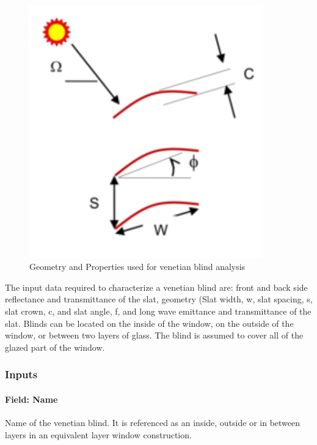 \begin{figure}[hbtp] %
\centering
\includegraphics[width=0.9\textwidth, height=0.9\textheight, keepaspectratio=true]{media/image047.png}
\caption{Geometry and Properties used for venetian blind analysis \protect \label{fig:geometry-and-properties-used-for-venetian}}
\end{figure}

The input data required to characterize a venetian blind are: front and back side reflectance and transmittance of the slat, geometry (Slat width, w, slat spacing, s, slat crown, c, and slat angle, f, and long wave emittance and transmittance of the slat. Blinds can be located on the inside of the window, on the outside of the window, or between two layers of glass. The blind is assumed to cover all of the glazed part of the window.

\subsubsection{Inputs}\label{inputs-28-001}

\paragraph{Field: Name}\label{field-name-22-003}

Name of the venetian blind. It is referenced as an inside, outside or in between layers in an equivalent layer window construction.


